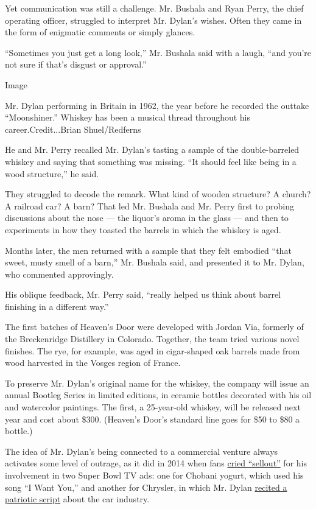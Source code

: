 Yet communication was still a challenge. Mr. Bushala and Ryan Perry, the
chief operating officer, struggled to interpret Mr. Dylan's wishes.
Often they came in the form of enigmatic comments or simply glances.

``Sometimes you just get a long look,'' Mr. Bushala said with a laugh,
``and you're not sure if that's disgust or approval.''

Image

Mr. Dylan performing in Britain in 1962, the year before he recorded the
outtake ``Moonshiner.'' Whiskey has been a musical thread throughout his
career.Credit...Brian Shuel/Redferns

He and Mr. Perry recalled Mr. Dylan's tasting a sample of the
double-barreled whiskey and saying that something was missing. ``It
should feel like being in a wood structure,'' he said.

They struggled to decode the remark. What kind of wooden structure? A
church? A railroad car? A barn? That led Mr. Bushala and Mr. Perry first
to probing discussions about the nose --- the liquor's aroma in the
glass --- and then to experiments in how they toasted the barrels in
which the whiskey is aged.

Months later, the men returned with a sample that they felt embodied
``that sweet, musty smell of a barn,'' Mr. Bushala said, and presented
it to Mr. Dylan, who commented approvingly.

His oblique feedback, Mr. Perry said, ``really helped us think about
barrel finishing in a different way.''

The first batches of Heaven's Door were developed with Jordan Via,
formerly of the Breckenridge Distillery in Colorado. Together, the team
tried various novel finishes. The rye, for example, was aged in
cigar-shaped oak barrels made from wood harvested in the Vosges region
of France.

To preserve Mr. Dylan's original name for the whiskey, the company will
issue an annual Bootleg Series in limited editions, in ceramic bottles
decorated with his oil and watercolor paintings. The first, a
25-year-old whiskey, will be released next year and cost about \$300.
(Heaven's Door's standard line goes for \$50 to \$80 a bottle.)

The idea of Mr. Dylan's being connected to a commercial venture always
activates some level of outrage, as it did in 2014 when fans
\href{http://www.cnn.com/2014/02/03/showbiz/tv/bob-dylan-super-bowl-commercial/index.html}{cried
``sellout''} for his involvement in two Super Bowl TV ads: one for
Chobani yogurt, which used his song ``I Want You,'' and another for
Chrysler, in which Mr. Dylan
\href{https://www.youtube.com/watch?v=zd18am6dc0Y}{recited a patriotic
script} about the car industry.

